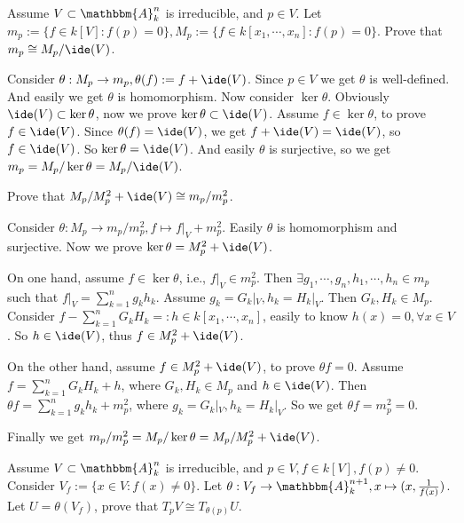 \documentclass{ctexart}
\newif\ifpreface
\begin{document}
\large
\setlength{\baselineskip}{1.2em}
\ifpreface
    
\newgeometry{left=2cm,right=2cm,top=2cm,bottom=2cm}
\else
{}
\maketitle
\fi
\begin{problem}
  Assume \(V \subset \mathbbm{A}_k^{n}\) is irreducible, and \(p \in V\). 
  Let \(m_p := \{f \in k[V] : f(p) = 0\}, M_p := \{f \in k[x_1,\cdots,x_n]: f(p) = 0\}\). 
  Prove that \(m_p \cong M_p/\ide(V)\). 
\end{problem}

\begin{solution}
  Consider \( \theta : M_p \to m_p ,\theta(f) := f + \ide(V)\).
  Since \( p \in V\) we get \(\theta\) is well-defined. 
  And easily we get \(\theta\) is homomorphism. Now consider \(\ker \theta\). 
  Obviously \(\ide(V) \subset \ker \theta\), now we prove \(\ker \theta \subset \ide(V)\). 
  Assume \( f \in \ker\theta\), to prove \(f \in \ide(V)\). 
  Since \(\theta(f)=\ide(V)\), we get \(f+\ide(V)=\ide(V)\), so \(f \in \ide(V)\). 
  So \(\ker \theta = \ide(V)\). And easily \(\theta\) is surjective, so we get 
  \(m_p=M_p/\ker \theta=M_p / \ide(V)\). 
\end{solution}
\begin{problem}
  Prove that \(M_p/M_p^2+\ide(V) \cong m_p/m_p^2\). 
\end{problem}

\begin{solution}
  Consider \(\theta : M_p \to m_p/m_p^2, f \mapsto f|_V+m_p^2\). Easily \(\theta\) is homomorphism and surjective. 
  Now we prove \(\ker \theta = M_p^2+\ide(V)\). 

  On one hand, assume \(f \in \ker \theta\), i.e., \(f|_V \in m_p^2\).
  Then \(\exists g_1,\cdots,g_n,h_1,\cdots,h_n \in m_p\) such that \(f|_V=\sum_{k=1}^{n} g_k h_k\). 
  Assume \(g_k=G_k|_V,h_k=H_k|_V\). Then \(G_k,H_k \in M_p\). 
  Consider \(f-\sum_{k=1}^{n} G_k H_k=:h \in k[x_1,\cdots,x_n]\), easily to know \(h(x)=0,\forall x \in V\). 
  So \(h \in \ide(V)\), thus \(f \in M_p^2+\ide(V)\). 

  On the other hand, assume \(f \in M_p^2+\ide(V)\), to prove \(\theta f =0\). 
  Assume \(f=\sum_{k=1}^{n} G_k H_k+h\), where \(G_k,H_k \in M_p\) and \(h \in \ide(V)\). 
  Then \(\theta f = \sum_{k=1}^{n} g_k h_k +m_p^2\), where \(g_k=G_k|_V,h_k=H_k|_V\). 
  So we get \(\theta f = m_p^2=0\). 

  Finally we get \(m_p/m_p^2 = M_p/ \ker \theta = M_p / M_p^2+\ide(V)\). 
\end{solution}
\begin{problem}
  Assume \(V \subset \mathbbm{A}_k^n\) is irreducible, and \(p \in V,f \in k[V], f(p)\neq 0\). 
  Consider \(V_f:= \{x \in V: f(x)\neq 0 \}\). Let \(\theta: V_f \to \mathbbm{A}_k^{n+1},x \mapsto (x,\frac{1}{f(x)})\). 
  Let \(U = \theta(V_f)\), prove that \(T_p V \cong T_{\theta(p)} U\). 
\end{problem}
\end{document}
